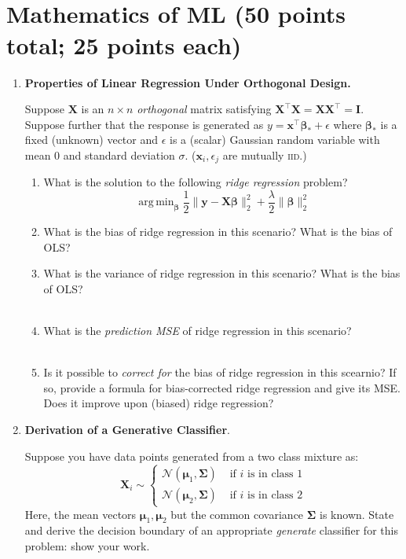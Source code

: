 \documentclass[12pt]{article}
\DeclareMathOperator{\argmin}{arg\,min}
\newcommand{\bx}{\bm{x}}
\newcommand{\bX}{\bm{X}}
\newcommand{\bI}{\bm{I}}
\newcommand{\by}{\bm{y}}
\newcommand{\bbeta}{\bm{\beta}}
\newcommand{\bmu}{\bm{\mu}}
\newcommand{\bSigma}{\bm{\Sigma}}
\begin{document}
~ 
\clearpage 

~ 
\clearpage 
\section*{Mathematics of ML (50 points total; 25 points each)}

\begin{enumerate}[label={\bf MA\arabic*.)}]
\item \textbf{Properties of Linear Regression Under Orthogonal Design.}

Suppose $\bX$ is an $n \times n$ \emph{orthogonal} matrix satisfying $\bX^{\top}\bX = \bX\bX^{\top} = \bI$. 
Suppose further that the response is generated as $y = \bx^{\top}\bbeta_* + \epsilon$ where $\bbeta_*$ is a fixed (unknown)
vector and $\epsilon$ is a (scalar) Gaussian random variable with mean 0 and standard deviation $\sigma$. ($\bx_i, \epsilon_j$ are mutually \textsc{iid}.)

\begin{enumerate}[label={\bf MA1.\alph*)}]
    \item What is the solution to the following \emph{ridge regression} problem? \[\argmin_{\bbeta} \frac{1}{2} \|\by - \bX\bbeta\|_2^2 + \frac{\lambda}{2}\|\bbeta\|_2^2\] \vspace{2in}
    \item What is the bias of ridge regression in this scenario? What is the bias of OLS? ~ \\ \vspace{2in}
    \item What is the variance of ridge regression in this scenario? What is the bias of OLS? \\ ~ \vspace{2in}
    \item What is the \emph{prediction MSE} of ridge regression in this scenario? \\ ~  \vspace{2in}
    \item Is it possible to \emph{correct for} the bias of ridge regression in this scearnio? If so, provide a formula for bias-corrected ridge regression and give its MSE. Does it improve upon (biased) ridge regression?
\end{enumerate}

\clearpage 
\item \textbf{Derivation of a Generative Classifier}. 

Suppose you have data points generated from a two class mixture as: 
\[\bX_i \sim \begin{cases} \mathcal{N}(\bmu_1, \bSigma) & \text{ if $i$ is in class 1} \\\mathcal{N}(\bmu_2, \bSigma) & \text{ if $i$ is in class 2} \end{cases}\]
Here, the mean vectors $\bmu_1, \bmu_2$ but the common covariance $\bSigma$ is known. State and derive the decision boundary of an appropriate \emph{generate} classifier for this problem: show your work.


\end{enumerate}
\end{document}
